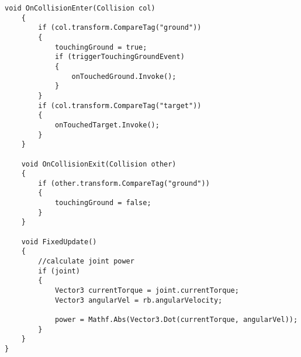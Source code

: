 \begin{lstlisting}[caption={Körperteil Skript},captionpos=b,label={lst:skript_körperteil}]
    void OnCollisionEnter(Collision col)
    {
        if (col.transform.CompareTag("ground"))
        {
            touchingGround = true;
            if (triggerTouchingGroundEvent)
            {
                onTouchedGround.Invoke();
            }
        }
        if (col.transform.CompareTag("target"))
        {
            onTouchedTarget.Invoke();
        }
    }

    void OnCollisionExit(Collision other)
    {
        if (other.transform.CompareTag("ground"))
        {
            touchingGround = false;
        }
    }

    void FixedUpdate()
    {
        //calculate joint power
        if (joint)
        {
            Vector3 currentTorque = joint.currentTorque;
            Vector3 angularVel = rb.angularVelocity;

            power = Mathf.Abs(Vector3.Dot(currentTorque, angularVel));
        }
    }
}
\end{lstlisting}

\newpage
